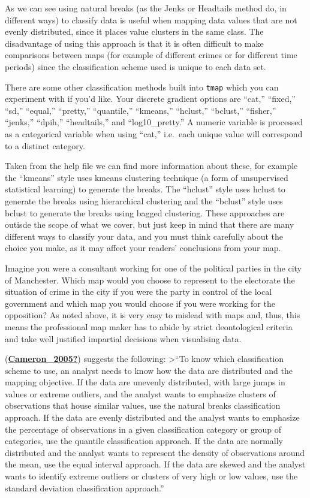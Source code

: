\documentclass[
]{book}
\begin{document}
As we can see using natural breaks (as the Jenks or Headtails method do, in different ways) to classify data is useful when mapping data values that are not evenly distributed, since it places value clusters in the same class. The disadvantage of using this approach is that it is often difficult to make comparisons between maps (for example of different crimes or for different time periods) since the classification scheme used is unique to each data set.

There are some other classification methods built into \texttt{tmap} which you can experiment with if you'd like. Your discrete gradient options are ``cat,'' ``fixed,'' ``sd,'' ``equal,'' ``pretty,'' ``quantile,'' ``kmeans,'' ``hclust,'' ``bclust,'' ``fisher,'' ``jenks,'' ``dpih,'' ``headtails,'' and ``log10\_pretty.'' A numeric variable is processed as a categorical variable when using ``cat,'' i.e.~each unique value will correspond to a distinct category.

Taken from the help file we can find more information about these, for example the ``kmeans'' style uses kmeans clustering technique (a form of unsupervised statistical learning) to generate the breaks. The ``hclust'' style uses hclust to generate the breaks using hierarchical clustering and the ``bclust'' style uses bclust to generate the breaks using bagged clustering. These approaches are outisde the scope of what we cover, but just keep in mind that there are many different ways to classify your data, and you must think carefully about the choice you make, as it may affect your readers' conclusions from your map.

Imagine you were a consultant working for one of the political parties in the city of Manchester. Which map would you choose to represent to the electorate the situation of crime in the city if you were the party in control of the local government and which map you would choose if you were working for the opposition? As noted above, it is very easy to mislead with maps and, thus, this means the professional map maker has to abide by strict deontological criteria and take well justified impartial decisions when visualising data.

(\protect\hyperlink{ref-Cameron_2005}{\textbf{Cameron\_2005?}}) suggests the following:
\textgreater{}``To know which classification scheme to use, an analyst needs to know how the
data are distributed and the mapping objective. If the data are unevenly distributed, with large jumps in values or extreme outliers, and the analyst wants to emphasize clusters of observations that house similar values, use the natural breaks classification approach. If the data are evenly distributed and the analyst wants to emphasize the percentage of observations in a given classification category or group of categories, use the quantile classification approach. If the data are normally distributed and the analyst wants to represent the density of observations around the mean, use the equal interval approach. If the data are skewed and the analyst wants to identify extreme outliers or clusters of very high or low values, use the standard deviation classification
approach.''
\end{document}
